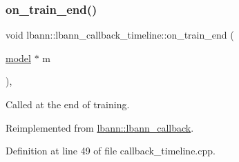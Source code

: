 \mbox{\label{classlbann_1_1lbann__callback__timeline_a7af247d7f016db358da0a57f8a4b76c6}} 
\subsubsection{\texorpdfstring{on\+\_\+train\+\_\+end()}{on\_train\_end()}}
{\footnotesize\ttfamily void lbann\+::lbann\+\_\+callback\+\_\+timeline\+::on\+\_\+train\+\_\+end (\begin{DoxyParamCaption}\item[{\hyperlink{classlbann_1_1model}{model} $\ast$}]{m }\end{DoxyParamCaption})\hspace{0.3cm}{\ttfamily [override]}, {\ttfamily [virtual]}}

Called at the end of training. 

Reimplemented from \hyperlink{classlbann_1_1lbann__callback_af28078b0ddaef45124465bef01eefedf}{lbann\+::lbann\+\_\+callback}.



Definition at line 49 of file callback\+\_\+timeline.\+cpp.



